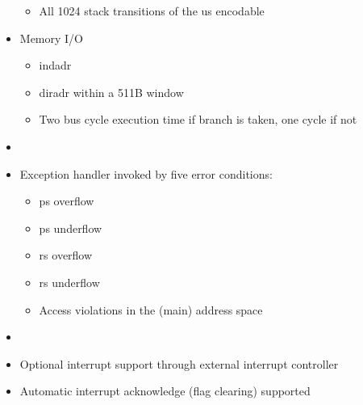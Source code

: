 \begin{description}[style=nextline]
\begin{itemize}
    \begin{itemize}
      \item All 1024 stack transitions of the \gls{us} encodable
    \end{itemize}
  \item Memory I/O
    \begin{itemize}
    \item \Gls{indadr}
    \item \Gls{diradr} within a 511B window
    \item Two bus cycle execution time if branch is taken, one cycle if not
    \end{itemize}   
  \end{itemize}

\item[Exceptions:]
  \begin{itemize}
  \item[]
  \item Exception handler invoked by five error conditions:
    \begin{itemize}
    \item \Gls{ps} overflow
    \item \Gls{ps} underflow
    \item \Gls{rs} overflow
    \item \Gls{rs} underflow
    \item Access violations in the (main) address space
    \end{itemize}
  \end{itemize}
    
\item[Interrupts:]
  \begin{itemize}
  \item[]
  \item Optional interrupt support through external interrupt controller
  \item Automatic interrupt acknowledge (flag clearing) supported
  \end{itemize}
  
\end{description}
